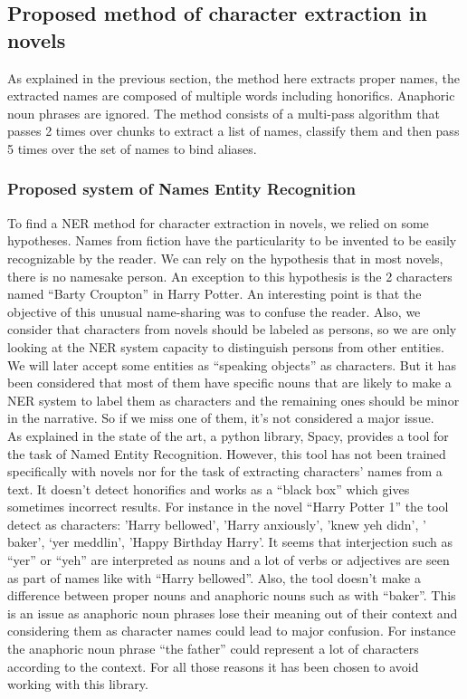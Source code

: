 \documentclass[a4paper, 12pt]{report}
\begin{document}
\subsection{Proposed method of character extraction in novels}
As explained in the previous section, the method here extracts proper names, the extracted names are composed of multiple words including honorifics.
Anaphoric noun phrases are ignored.
The method consists of a multi-pass algorithm that passes 2 times over chunks to extract a list of names, classify them and then pass 5 times over the set of names to bind aliases.

\subsubsection{Proposed system of Names Entity Recognition}
\label{section:NER}
To find a NER method for character extraction in novels, we relied on some hypotheses.
Names from fiction have the particularity to be invented to be easily recognizable by the reader.
We can rely on the hypothesis that in most novels, there is no namesake person. An exception to this hypothesis is the 2 characters named ``Barty Croupton'' in Harry Potter.
An interesting point is that the objective of this unusual name-sharing was to confuse the reader.
Also, we consider that characters from novels should be labeled as persons, so we are only looking at the NER system capacity to distinguish persons from other entities.
We will later accept some entities as ``speaking objects'' as characters.
But it has been considered that most of them have specific nouns that are likely to make a NER system to label them as characters
and the remaining ones should be minor in the narrative. So if we miss one of them, it's not considered a major issue.\\

As explained in the state of the art, a python library, Spacy, provides a tool for the task of Named Entity Recognition.
However, this tool has not been trained specifically with novels nor for the task of extracting characters' names from a text.
It doesn't detect honorifics and works as a ``black box'' which gives sometimes incorrect results.
For instance in the novel ``Harry Potter 1'' the tool detect as characters: 'Harry bellowed', 'Harry anxiously', 'knew yeh didn', ' baker', `yer meddlin', 'Happy Birthday Harry'.
It seems that interjection such as ``yer'' or ``yeh'' are interpreted as nouns and a lot of verbs or adjectives are seen as part of names like with ``Harry bellowed''.
Also, the tool doesn't make a difference between proper nouns and anaphoric nouns such as with ``baker''.
This is an issue as anaphoric noun phrases lose their meaning out of their context and considering them as character names could lead to major confusion.
For instance the anaphoric noun phrase ``the father'' could represent a lot of characters according to the context.
For all those reasons it has been chosen to avoid working with this library. \\
\end{document}
